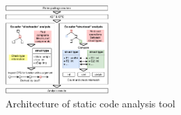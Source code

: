 \begin{figure}[t!] %
    \centering
    \includegraphics[width=0.35\textwidth]{gfx/figures/go-safer-architecture-pdf.pdf}
    \caption{Architecture of \toolSA{} static code analysis tool}
    \label{fig:safer-architecture}
\end{figure}
